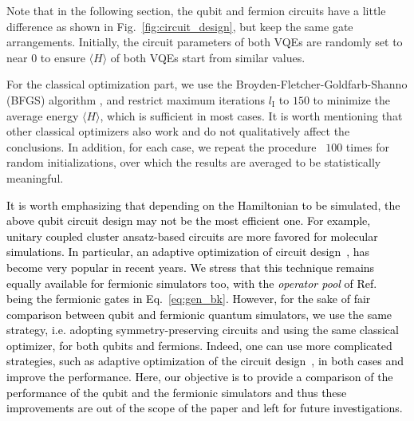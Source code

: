 \documentclass[aps, prx, reprint, superscriptaddress]{revtex4-2}
\begin{document}
Note that in the following section, the qubit and fermion circuits have a little difference as shown in Fig.~\ref{fig:circuit_design}, but keep the same gate arrangements. Initially, the circuit parameters of both VQEs are randomly set to near $0$ to ensure $\langle H \rangle$ of both VQEs start from similar values. 

For the classical optimization part, we use the Broyden-Fletcher-Goldfarb-Shanno (BFGS) algorithm \cite{broyden1970convergence,fletcher1970new,goldfarb1970family,shanno1970conditioning}, and restrict maximum iterations $l_\text{I}$ to $150$ to minimize the average energy $\langle H \rangle$, which is sufficient in most cases. It is worth mentioning that other classical optimizers also work and do not qualitatively affect the conclusions.  In addition, for each case, we repeat the procedure ~$100$ times for random initializations, over which the results are averaged to be statistically meaningful. 

\textcolor{black}{It is worth emphasizing that depending on the Hamiltonian to be simulated, the above qubit circuit design may not be the most efficient one. For example, unitary coupled cluster ansatz-based circuits are more favored for molecular simulations. In particular, an adaptive optimization of circuit design~\citep{Grimsley2019An}, has become very popular in recent years. 
We stress that this technique remains equally available for fermionic simulators too, with the \emph{operator pool} of Ref.~\cite{Grimsley2019An} being the fermionic gates in Eq.~\eqref{eq:gen_bk}. However, for the sake of fair comparison between qubit and fermionic quantum simulators, we use the same strategy, i.e. adopting symmetry-preserving circuits and using the same classical optimizer, for both qubits and fermions. Indeed, one can use more complicated strategies, such as adaptive optimization of the circuit design~\citep{Grimsley2019An}, in both cases and improve the performance. Here, our objective is to provide a comparison of the performance of the qubit and the fermionic simulators and thus these improvements are out of the scope of the paper and left for future investigations.}
 
 
\end{document}
